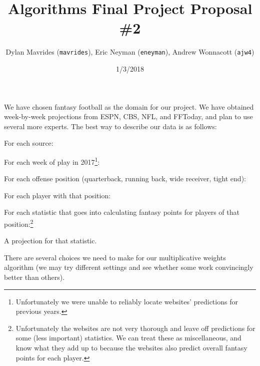 \documentclass{article}
\title{Algorithms Final Project Proposal \#2}
\author{
    Dylan  Mavrides  (\texttt{mavrides}),
    Eric   Neyman    (\texttt{eneyman}),
    Andrew Wonnacott (\texttt{ajw4})
    }
\date{1/3/2018}
\begin{document}
\maketitle

We have chosen fantasy football as the domain for our project. We have obtained week-by-week projections from ESPN, CBS, NFL, and FFToday, and plan to use several more experts. The best way to describe our data is as follows:

For each source:

\quad For each week of play in 2017\footnote{Unfortunately we were unable to reliably locate websites' predictions for previous years.}:

\quad \quad For each offense position (quarterback, running back, wide receiver, tight end):

\quad \quad \quad For each player with that position:

\quad \quad \quad \quad For each statistic that goes into calculating fantasy points for players of that position:\footnote{Unfortunately the websites are not very thorough and leave off predictions for some (less important) statistics. We can treat these as miscellaneous, and know what they add up to because the websites also predict overall fantasy points for each player.}

\quad \quad \quad \quad \quad A projection for that statistic.

There are several choices we need to make for our multiplicative weights algorithm (we may try different settings and see whether some work convincingly better than others).
\end{document}
